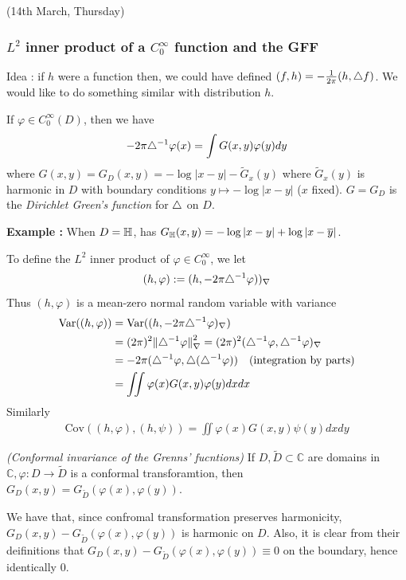 \documentclass[12pt,a4paper]{article}
\newenvironment{proof}
{\begin{changemargin}{0.5cm}{0.5cm} 
	}%
	{\end{changemargin}
}
\newenvironment{p}
{\begin{proof} 
	}%
	{\end{proof}
}
\begin{document}
\newday

(14th March, Thursday)

\subsubsection*{$L^2$ inner product of a $C_0^{\infty}$ function and the GFF}

Idea : if $h$ were a function then, we could have defined $(f,h) = -\frac{1}{2\pi} (h, \triangle f)$. We would like to do something similar with distribution $h$.
\s

If $\varphi \in C_0^{\infty}(D)$, then we have 
\begin{align*}
-2\pi \triangle^{-1} \varphi(x) = \int G(x,y) \varphi(y) dy
\end{align*}
where $G(x,y) = G_D(x,y) = -\log |x-y| -\tilde{G}_x(y)$ where $\tilde{G}_x(y)$ is harmonic in $D$ with boundary conditions $y\mapsto -\log |x-y|$ ($x$ fixed). $G= G_D$ is the \emph{Dirichlet Green's function} for $\triangle$ on $D$.
\s

\textbf{Example :} When $D= \mathbb{H}$, has $G_{\mathbb{H}}(x,y) =-\log |x-y| + \log |x-\overline{y}|$.
\s

To define the $L^2$ inner product of $\varphi \in C_0^{\infty}$, we let
\begin{align*}
(h, \varphi) := (h, -2\pi \triangle^{-1} \varphi) )_{\nabla}
\end{align*}
Thus $(h, \varphi)$ is a mean-zero normal random variable with variance
\begin{align*}
\text{Var}((h, \varphi)) &= \text{Var}((h, -2\pi \lap^{-1}\varphi)_{\nabla}) \\
&=(2\pi)^2 \snorms{\lap^{-1}\varphi}{\nabla}^2 = (2\pi)^2 (\lap^{-1}\varphi, \lap^{-1}\varphi)_{\nabla} \\
&= -2\pi (\lap^{-1}\varphi, \lap ( \lap^{-1} \varphi)) \quad \text{(integration by parts)} \\
&=\iint \varphi(x) G(x,y) \varphi(y)dxdx 
\end{align*}
Similarly
\begin{align*}
\text{Cov}((h, \varphi), (h, \psi)) = \iint \varphi(x) G(x,y) \psi(y) dxdy
\end{align*}
\s

\prop \emph{(Conformal invariance of the Grenns' fucntions)} If $D, \tilde{D} \subset \mathbb{C}$ are domains in $\mathbb{C}, \varphi : D \rightarrow \tilde{D}$ is a conformal transforamtion, then $G_D(x,y) = G_{\tilde{D}}(\varphi(x),\varphi(y))$. 
\begin{p}
\pf We have that, since confromal transformation preserves harmonicity, $G_D(x,y) - G_{\tilde{D}}(\varphi(x), \varphi(y))$ is harmonic on $D$. Also, it is clear from their deifinitions that $G_D(x,y) - G_{\tilde{D}}(\varphi(x), \varphi(y)) \equiv 0$ on the boundary, hence identically 0.

\eop 
\end{p}
\s
\end{document}
